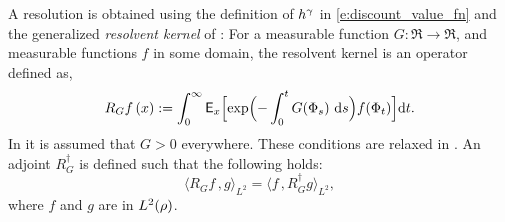 A resolution is obtained using the definition of $h^\gamma$ in \eqref{e:discount_value_fn} and the generalized \textit{resolvent kernel} of \cite{nev72,meytwe93e,devkonmey17a}: For a measurable function $G\colon\Re\to\Re$, and measurable functions $f$ in some domain, the resolvent kernel is an operator defined as,
\begin{equation}
R_G f\, (x) := \int_0^\infty \Expect_x\Bigl[ \exp\Bigl(-\int_0^t G(\markovstate_s)\, \rmd s \Bigr) f(\markovstate_t)\Bigr] \ud t.
\label{e:resolvent_neveu}
\end{equation}
In  \cite{nev72,meytwe93e} it is assumed that $G>0$ everywhere. These conditions are relaxed in \cite{konmey03a,devkonmey17a}. An adjoint $R^\dagger_G$ is defined such that the following holds:
\begin{equation}
\langle R_G f \, , g \rangle_{L^2} = \langle f \, , R^\dagger_G g \rangle_{L^2}, 
\label{e:RG_adjoint}
\end{equation}
where $f$ and $g$ are in $L^2(\rho)$. 

